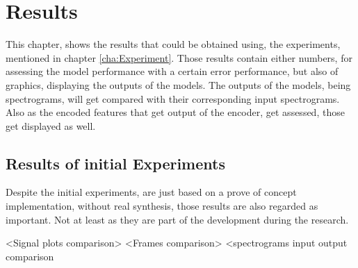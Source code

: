 \chapter[Results]{Results}
\label{cha:Results}

This chapter, shows the results that could be obtained using, the experiments, mentioned in chapter \ref{cha:Experiment}. Those results contain either numbers, for assessing the model performance with a certain error performance, but also of graphics, displaying the outputs of the models. The outputs of the models, being spectrograms, will get compared with their corresponding input spectrograms. Also as the encoded features that get output of the encoder, get assessed, those get displayed as well. 


\section{Results of initial Experiments}
Despite the initial experiments, are just based on a prove of concept implementation, without real synthesis, those results are also regarded as important. Not at least as they are part of the development during the research. 


<Signal plots comparison>
<Frames comparison>
<spectrograms input output comparison

